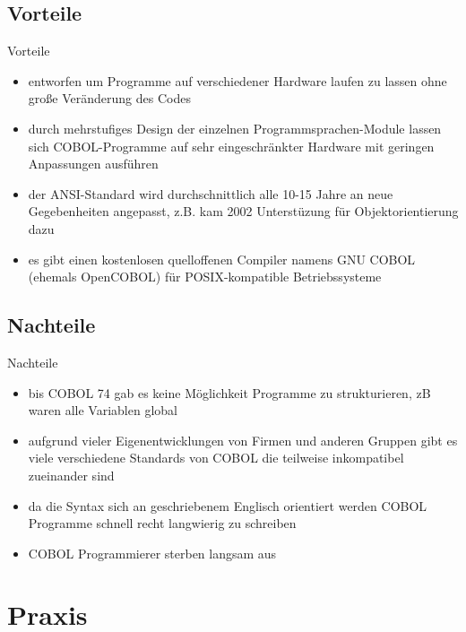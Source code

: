 \documentclass{beamer}
\begin{document}
\subsection{Vorteile}
\begin{frame}{Vorteile}
	\begin{itemize}[<+->]
		\item
			entworfen um Programme auf verschiedener Hardware laufen zu lassen ohne große Ver\"anderung des Codes
		\item
			durch mehrstufiges Design der einzelnen Programmsprachen-Module lassen sich COBOL-Programme auf sehr eingeschr\"ankter Hardware mit geringen Anpassungen ausf\"uhren
		\item
			der ANSI-Standard wird durchschnittlich alle 10-15 Jahre an neue Gegebenheiten angepasst, z.B. kam 2002 Unterstüzung für Objektorientierung dazu
		\item
			es gibt einen kostenlosen quelloffenen Compiler namens GNU COBOL (ehemals OpenCOBOL) für POSIX-kompatible Betriebssysteme
	\end{itemize}
\end{frame}


\subsection{Nachteile}
\begin{frame}{Nachteile}
	\begin{itemize}[<+->]
		\item
		    bis COBOL 74 gab es keine M\"oglichkeit Programme zu strukturieren, zB waren alle Variablen global
		\item
			aufgrund vieler Eigenentwicklungen von Firmen und anderen Gruppen gibt es viele verschiedene Standards von COBOL die teilweise inkompatibel zueinander sind
		\item
			da die Syntax sich an geschriebenem Englisch orientiert werden COBOL Programme schnell recht langwierig zu schreiben
		\item
			COBOL Programmierer sterben langsam aus
	\end{itemize}
\end{frame}


\section{Praxis}
\end{document}
